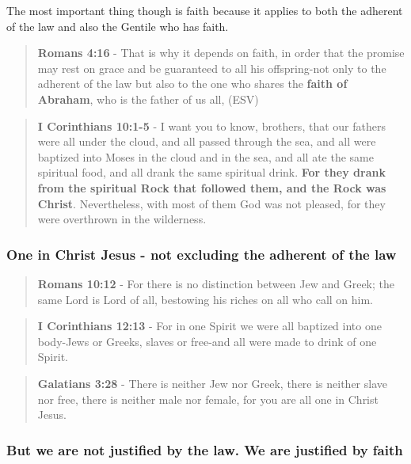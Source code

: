 \documentclass[11pt]{article}
\begin{document}
The most important thing though is faith because it applies to both the adherent of the law and also the Gentile who has faith.

\begin{quote}
\textbf{Romans 4:16} - That is why it depends on faith, in order that the promise may rest on grace and be guaranteed to all his offspring-not only to the adherent of the law but also to the one who shares the \textbf{faith of Abraham}, who is the father of us all, (ESV)
\end{quote}

\begin{quote}
\textbf{I Corinthians 10:1-5} - I want you to know, brothers, that our fathers were all under the cloud, and all passed through the sea, and all were baptized into Moses in the cloud and in the sea, and all ate the same spiritual food, and all drank the same spiritual drink. \textbf{For they drank from the spiritual Rock that followed them, and the Rock was Christ}. Nevertheless, with most of them God was not pleased, for they were overthrown in the wilderness.
\end{quote}

\subsubsection{One in Christ Jesus - not excluding the adherent of the law}
\label{sec:org7c0f857}

\begin{quote}
\textbf{Romans 10:12} - For there is no distinction between Jew and Greek; the same Lord is Lord of all, bestowing his riches on all who call on him.
\end{quote}

\begin{quote}
\textbf{I Corinthians 12:13} - For in one Spirit we were all baptized into one body-Jews or Greeks, slaves or free-and all were made to drink of one Spirit.
\end{quote}

\begin{quote}
\textbf{Galatians 3:28} - There is neither Jew nor Greek, there is neither slave nor free, there is neither male nor female, for you are all one in Christ Jesus.
\end{quote}

\subsubsection{But we are not justified by the law. We are justified by faith}
\label{sec:orgd30be7c}
\end{document}
